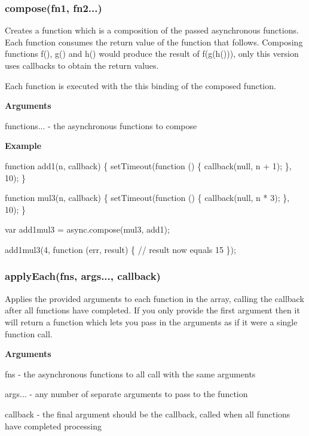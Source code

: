  \label{_compose}%
 \subsubsection*{compose(fn1, fn2...)}

Creates a function which is a composition of the passed asynchronous functions. Each function consumes the return value of the function that follows. Composing functions f(), g() and h() would produce the result of f(g(h())), only this version uses callbacks to obtain the return values.

Each function is executed with the {\ttfamily this} binding of the composed function.

{\bfseries Arguments}


\begin{DoxyItemize}
\item functions... -\/ the asynchronous functions to compose
\end{DoxyItemize}

{\bfseries Example}


\begin{DoxyCode}
function add1(n, callback) \{
    setTimeout(function () \{
        callback(null, n + 1);
    \}, 10);
\}

function mul3(n, callback) \{
    setTimeout(function () \{
        callback(null, n * 3);
    \}, 10);
\}

var add1mul3 = async.compose(mul3, add1);

add1mul3(4, function (err, result) \{
   // result now equals 15
\});
\end{DoxyCode}
 

 \label{_applyEach}%
 \subsubsection*{apply\+Each(fns, args..., callback)}

Applies the provided arguments to each function in the array, calling the callback after all functions have completed. If you only provide the first argument then it will return a function which lets you pass in the arguments as if it were a single function call.

{\bfseries Arguments}


\begin{DoxyItemize}
\item fns -\/ the asynchronous functions to all call with the same arguments
\item args... -\/ any number of separate arguments to pass to the function
\item callback -\/ the final argument should be the callback, called when all functions have completed processing
\end{DoxyItemize}

